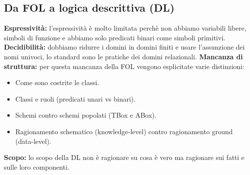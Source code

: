 \documentclass[../main.tex]{subfiles}
\begin{document}
   \subsection{Da FOL a logica descrittiva (DL)}
   \textbf{Espressività:} l'espressività è molto limitata perchè non abbiamo variabili libere, simboli di funzione e abbiamo solo predicati binari come simboli primitivi.
   \spazio
   \textbf{Decidibilità:} dobbiamo ridurre i domini in domini finiti e usare l'assunzione dei nomi univoci, lo standard sono le pratiche dei domini relazionali.
   \spazio
   \textbf{Mancanza di struttura:} per questa mancanza della FOL vengono esplicitate varie distinzioni:
   \begin{itemize}
      \item Come sono costrite le classi.
      \item Classi e ruoli (predicati unari vs binari).
      \item Schemi contro schemi popolati (TBox e ABox).
      \item Ragionamento schematico  (knowledge-level) contro ragionamento ground  (data-level).
   \end{itemize}
   \textbf{Scopo:} lo scopo della DL non è ragionare su cosa è vero ma ragionare sui fatti e sulle loro componenti.
\end{document}
